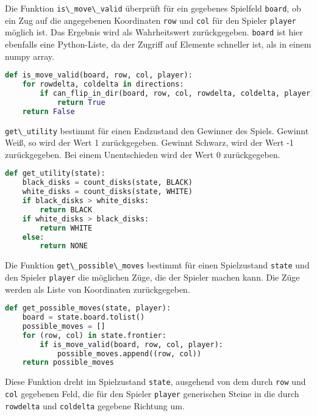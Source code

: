 Die Funktion \passthrough{\lstinline!is\_move\_valid!} überprüft für ein
gegebenes Spielfeld \passthrough{\lstinline!board!}, ob ein Zug auf die
angegebenen Koordinaten \passthrough{\lstinline!row!} und
\passthrough{\lstinline!col!} für den Spieler
\passthrough{\lstinline!player!} möglich ist. Das Ergebnis wird als
Wahrheitswert zurückgegeben. \passthrough{\lstinline!board!} ist hier
ebenfalls eine Python-Liste, da der Zugriff auf Elemente schneller ist,
als in einem numpy array.

\begin{lstlisting}[language=Python]
def is_move_valid(board, row, col, player):
    for rowdelta, coldelta in directions:
        if can_flip_in_dir(board, row, col, rowdelta, coldelta, player):
            return True
    return False
\end{lstlisting}

\passthrough{\lstinline!get\_utility!} bestimmt für einen Endzustand den
Gewinner des Spiels. Gewinnt Weiß, so wird der Wert 1 zurückgegeben.
Gewinnt Schwarz, wird der Wert -1 zurückgegeben. Bei einem Unentschieden
wird der Wert 0 zurückgegeben.

\begin{lstlisting}[language=Python]
def get_utility(state):
    black_disks = count_disks(state, BLACK)
    white_disks = count_disks(state, WHITE)
    if black_disks > white_disks:
        return BLACK
    if white_disks > black_disks:
        return WHITE
    else:
        return NONE
\end{lstlisting}

Die Funktion \passthrough{\lstinline!get\_possible\_moves!} bestimmt für
einen Spielzustand \passthrough{\lstinline!state!} und den Spieler
\passthrough{\lstinline!player!} die möglichen Züge, die der Spieler
machen kann. Die Züge werden als Liste von Koordinaten zurückgegeben.

\begin{lstlisting}[language=Python]
def get_possible_moves(state, player):
    board = state.board.tolist()
    possible_moves = []
    for (row, col) in state.frontier:
        if is_move_valid(board, row, col, player):
            possible_moves.append((row, col))
    return possible_moves
\end{lstlisting}

Diese Funktion dreht im Spielzustand \passthrough{\lstinline!state!},
ausgehend von dem durch \passthrough{\lstinline!row!} und
\passthrough{\lstinline!col!} gegebenen Feld, die für den Spieler
\passthrough{\lstinline!player!} generischen Steine in die durch
\passthrough{\lstinline!rowdelta!} und
\passthrough{\lstinline!coldelta!} gegebene Richtung um.

